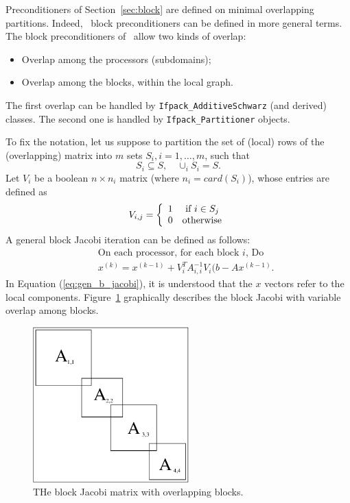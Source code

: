 \bigskip

Preconditioners of Section~\ref{sec:block} are defined on minimal overlapping
partitions. Indeed, \ifpack\ block preconditioners can be defined in more
general terms. The block preconditioners of \ifpack\ 
allow two kinds of overlap:
\begin{itemize}
\item Overlap among the processors (subdomains);
\item Overlap among the blocks, within the local graph.
\end{itemize}
The first overlap can be handled by \verb!Ifpack_AdditiveSchwarz! (and
derived) classes. The second one is handled by \verb!Ifpack_Partitioner!
objects.

To fix the notation, let us suppose to partition the set of (local) rows of 
the (overlapping) matrix into $m$ sets $S_i, i=1, \ldots,m$, such that
\[
S_i \subseteq S, \quad \cup_i S_i = S.
\]
Let $V_i$ be a
boolean $n \times n_i$ matrix (where $n_i = card(S_i)$), whose entries are
defined as
\[
V_{i,j} = \left\{
\begin{array}{l l}
1 & \mbox{ if } i \in S_j \\
  0 & \mbox{otherwise}
\end{array}
  \right.
\]
A general block Jacobi iteration can be defined as follows:
\begin{eqnarray}
&& \mbox{On each processor, for each block $i$, Do} \\
&& \label{eq:gen_b_jacobi}
x^{(k)} = x^{(k-1)} + V_i^T A_{i,i}^{-1} V_i(b - A x^{(k-1)}.
\end{eqnarray}
In Equation (\ref{eq:gen_b_jacobi}), it is understood that the $x$ vectors
refer to the local components.
Figure~\ref{fig:bj} graphically describes the block Jacobi with variable
overlap among blocks.

\begin{figure}
\begin{center}
\includegraphics[width=6cm]{bj.eps}
\end{center}
\caption{THe block Jacobi matrix with overlapping blocks.}
\label{fig:bj}
\end{figure}

